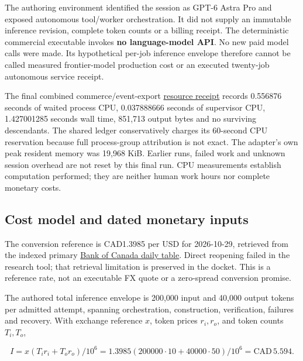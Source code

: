 \documentclass[
  11pt,
]{article}
\begin{document}
The authoring environment identified the session as GPT-6 Astra Pro and
exposed autonomous tool/worker orchestration. It did not supply an
immutable inference revision, complete token counts or a billing
receipt. The deterministic commercial executable invokes \textbf{no
language-model API}. No new paid model calls were made. Its hypothetical
per-job inference envelope therefore cannot be called measured
frontier-model production cost or an executed twenty-job autonomous
service receipt.

The final combined commerce/event-export
\href{https://github.com/MontrealAI/AGI-Alpha-Invention-Flywheel-Lab/blob/b0d828309f14ef4dc278dc522739df85db43c460/evidence/next009/archives/commerce-r1.manifest.json}{resource
receipt} records 0.556876 seconds of waited process CPU, 0.037888666
seconds of supervisor CPU, 1.427001285 seconds wall time, 851,713 output
bytes and no surviving descendants. The shared ledger conservatively
charges its 60-second CPU reservation because full process-group
attribution is not exact. The adapter's own peak resident memory was
19,968 KiB. Earlier runs, failed work and unknown session overhead are
not reset by this final run. CPU measurements establish computation
performed; they are neither human work hours nor complete monetary
costs.

\hypertarget{cost-model-and-dated-monetary-inputs}{%
\subsection{Cost model and dated monetary
inputs}\label{cost-model-and-dated-monetary-inputs}}

The conversion reference is CAD1.3985 per USD for 2026-10-29, retrieved
from the indexed primary
\href{https://www.bankofcanada.ca/rates/exchange/daily-exchange-rates-lookup/?dF=2026-10-16\&dT=2026-10-30\&lP=lookup_daily_exchange_rates_2017.php\&rangeType=dates\&sR=2017-01-01\&se=FXUSDCAD}{Bank
of Canada daily table}. Direct reopening failed in the research tool;
that retrieval limitation is preserved in the docket. This is a
reference rate, not an executable FX quote or a zero-spread conversion
promise.

The authored total inference envelope is 200,000 input and 40,000 output
tokens per admitted attempt, spanning orchestration, construction,
verification, failures and recovery. With exchange reference \(x\),
token prices \(r_i,r_o\), and token counts \(T_i,T_o\),

\[
I=x(T_i r_i+T_o r_o)/10^6
 =1.3985(200000\cdot10+40000\cdot50)/10^6
 =\mathrm{CAD}\,5.594.
\]
\end{document}
